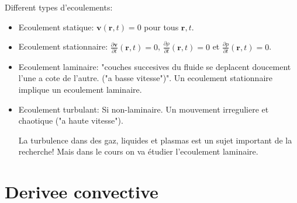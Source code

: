 Different types d'ecoulements:
\begin{itemize}
\item Ecoulement statique: $\boldsymbol{v}(\boldsymbol{r},t)=0$ pour tous $\boldsymbol{r},t$.
\item Ecoulement stationnaire: $\frac{ \partial \boldsymbol{v} }{ \partial t }(\boldsymbol{r},t)=0$, $\frac{ \partial \rho }{ \partial t }(\boldsymbol{r},t)=0$ et $\frac{ \partial p }{ \partial t }(\boldsymbol{r},t)=0$. 
\item Ecoulement laminaire: "couches succesives du fluide se deplacent doucement l'une a cote de l'autre. ("a basse vitesse")". Un ecoulement stationnaire implique un ecoulement laminaire.
\item Ecoulement turbulant: Si non-laminaire. Un mouvement irreguliere et chaotique ("a haute vitesse").
\begin{remark}
La turbulence dans des gaz, liquides et plasmas est un sujet important de la recherche! Mais dans le cours on va étudier l'ecoulement laminaire.
\end{remark}
\end{itemize}

\section{Derivee convective}

